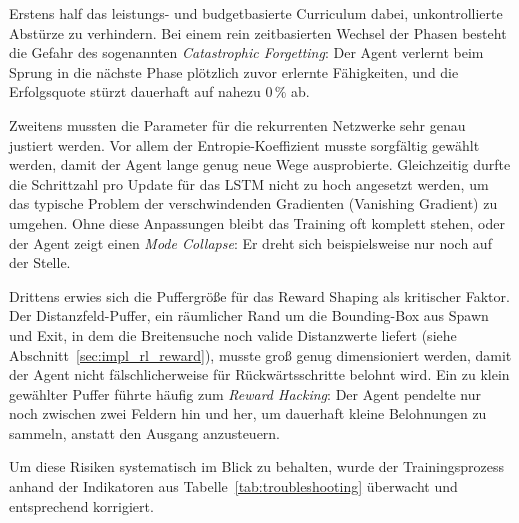 \documentclass[
  a4paper,
  11pt,
  twoside,
  BCOR=8mm,           %
  headings=big,
  numbers=noenddot,
  listof=totoc,       %
  captions=tableheading,
]{scrreprt}
\begin{document}
Erstens half das leistungs- und budgetbasierte Curriculum dabei, unkontrollierte Abstürze zu verhindern. Bei einem rein zeitbasierten Wechsel der Phasen besteht die Gefahr des sogenannten \textit{Catastrophic Forgetting}: Der Agent verlernt beim Sprung in die nächste Phase plötzlich zuvor erlernte Fähigkeiten, und die Erfolgsquote stürzt dauerhaft auf nahezu $0\,\%$ ab.

Zweitens mussten die Parameter für die rekurrenten Netzwerke sehr genau justiert werden. Vor allem der Entropie-Koeffizient musste sorgfältig gewählt werden, damit der Agent lange genug neue Wege ausprobierte. Gleichzeitig durfte die Schrittzahl pro Update für das LSTM nicht zu hoch angesetzt werden, um das typische Problem der verschwindenden Gradienten (Vanishing Gradient) zu umgehen. Ohne diese Anpassungen bleibt das Training oft komplett stehen, oder der Agent zeigt einen \textit{Mode Collapse}: Er dreht sich beispielsweise nur noch auf der Stelle.

Drittens erwies sich die Puffergröße für das Reward Shaping als kritischer Faktor. Der Distanzfeld-Puffer, ein räumlicher Rand um die Bounding-Box aus Spawn und Exit, in dem die Breitensuche noch valide Distanzwerte liefert (siehe Abschnitt~\ref{sec:impl_rl_reward}), musste groß genug dimensioniert werden, damit der Agent nicht fälschlicherweise für Rückwärtsschritte belohnt wird. Ein zu klein gewählter Puffer führte häufig zum \textit{Reward Hacking}: Der Agent pendelte nur noch zwischen zwei Feldern hin und her, um dauerhaft kleine Belohnungen zu sammeln, anstatt den Ausgang anzusteuern.

Um diese Risiken systematisch im Blick zu behalten, wurde der Trainingsprozess anhand der Indikatoren aus Tabelle~\ref{tab:troubleshooting} überwacht und entsprechend korrigiert.
\end{document}
